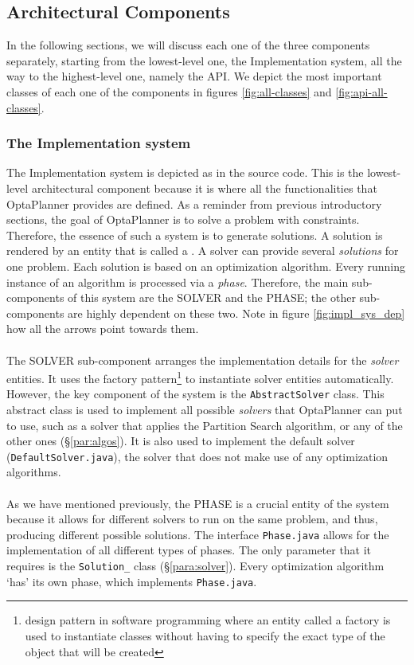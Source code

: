 \subsection{Architectural Components}
In the following sections, we will discuss each one of the three components separately, starting from the lowest-level one, the Implementation system, all the way to the highest-level one, namely the API. We depict the most important classes of each one of the components in figures \ref{fig:all-classes} and \ref{fig:api-all-classes}.
\subsubsection{The Implementation system}
The Implementation system is depicted as  in the source code. This is the lowest-level architectural component because it is where all the functionalities that OptaPlanner provides are defined. As a reminder from previous introductory sections, the goal of OptaPlanner is to solve a problem with constraints. Therefore, the essence of such a system is to generate solutions. A solution is rendered by an entity that is called a . A solver can provide several \textit{solutions} for one problem. Each solution is based on an optimization algorithm. Every running instance of an algorithm is processed via a \textit{phase}. 
Therefore, the main sub-components of this system are the {\scriptsize SOLVER} and the {\scriptsize PHASE}; the other sub-components are highly dependent on these two. Note in figure \ref{fig:impl_sys_dep} how all the arrows point towards them. \\\\
The {\scriptsize SOLVER} sub-component arranges the implementation details for the \textit{solver} entities. It uses the factory pattern\footnote{design pattern in software programming where an entity called a factory is used to instantiate classes without having to specify the exact type of the object that will be created} to instantiate solver entities automatically. However, the key component of the system is the \verb!AbstractSolver! class. This abstract class is used to implement all possible \textit{solvers} that OptaPlanner can put to use, such as a solver that applies the Partition Search algorithm, or any of the other ones (\S\ref{par:algos}). It is also used to implement the default solver (\verb!DefaultSolver.java!), the solver that does not make use of any optimization algorithms.\\\\
As we have mentioned previously, the {\scriptsize PHASE} is a crucial entity of the system because it allows for different solvers to run on the same problem, and thus, producing different possible solutions. The interface \verb!Phase.java! allows for the implementation of all different types of phases. The only parameter that it requires is the \verb!Solution_! class (\S\ref{para:solver}). Every optimization algorithm `has’ its own phase, which implements \verb!Phase.java!.
